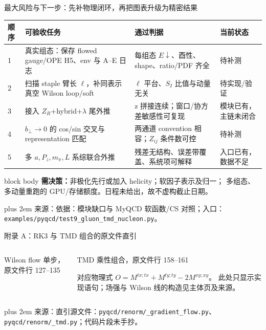 \documentclass[UTF8,aspectratio=169,11pt]{ctexbeamer}
\renewcommand{\arraystretch}{0.92}
\newcommand{\source}[1]{%
  \par\vspace{0.02em}\begingroup\fontsize{6}{6.8}\selectfont\raggedright\sloppy
  \setlength{\emergencystretch}{3em}\rightskip=0pt plus 2em
  \color{muted}来源：#1\par\endgroup}
\begin{document}
\begin{frame}[t]{最大风险与下一步：先补物理闭环，再把图表升级为精密结果}
  \footnotesize
  \renewcommand{\arraystretch}{0.82}
  \begin{tabularx}{0.98\textwidth}{@{}p{}Yp{0.30\textwidth}Y@{}}
    \toprule
    顺序 & 可验收任务 & 通过判据 & 当前状态\\
     & 真实组态：保存 flowed gauge/OPE H5、env 与 A--E 日志 & 每组态 \(E\downarrow\)、酉性、shape、ratio/PDF 齐全 & 待补测\\
    2 & 扫描 staple 臂长 \(\ell\)，补同表示真空 Wilson loop/soft & \(\ell\) 平台、\(S_I\) 比值与动量无关 & 待实现/验证\\
    3 & 接入 \(Z_R\)+hybrid+\(\lambda\) 尾外推 & z 拼接连续；窗口/协方差敏感性可复现 & 模块已有，主链未闭合\\
    4 & \(b_\perp\to0\) 的 cos/sin 交叉与 representation 匹配 & 两通道 convention 相容；\(Z_{ij}\) 条件数可控 & 待补测\\
    5 & 多 \(a,P_z,m_\pi,L\) 系综联合外推 & 残差无结构、误差带覆盖、系统项可解释 & 入口已有，数据不足\\
    \bottomrule
  \end{tabularx}
  \vspace{0.1em}
  \begin{beamercolorbox}[wd=0.98\textwidth,sep=0.18em,rounded=true]{block body}
    \scriptsize\textbf{需决策：}非极化先行或加入 helicity；软因子表示及归一；
    多组态、多动量重跑的 GPU/存储额度。日程未给出，故不虚构截止日期。
  \end{beamercolorbox}
  \source{依据：模块缺口与 MyQCD 软函数/CS 对照；入口：\nolinkurl{examples/pyqcd/test9_gluon_tmd_nucleon.py}。}
\end{frame}

\appendix

\begin{frame}[t]{附录 A：RK3 与 TMD 组合的原文件直引}
  \begin{columns}[T,totalwidth=\textwidth]
    \begin{column}{0.47\textwidth}
      \begin{block}{Wilson flow 单步，原文件行 127--135}
        
      \end{block}
    \end{column}
    \begin{column}{0.47\textwidth}
      \begin{block}{TMD 乘性组合，原文件行 158--161}
        
      \end{block}
      \begin{block}{对应物理式}
        \(O=M^{tx;tx}+M^{ty;ty}-2M^{xy;xy}\)。
        此处只显示实现语句；场强与 Wilson 线的构造见主体页及来源。
      \end{block}
    \end{column}
  \end{columns}
  \source{直引源文件：\nolinkurl{pyqcd/renorm/_gradient_flow.py}、\nolinkurl{pyqcd/renorm/_tmd.py}；代码片段未手抄。}
\end{frame}
\end{document}
